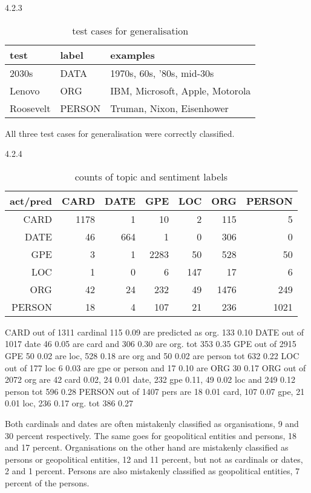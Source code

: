 \documentclass[11pt]{article}
\begin{document}
4.2.3

\begin{table}[ht]\footnotesize
\caption{test cases for generalisation}
\label{tab:generalisation}
\begin{tabular}{ l l l }
test & label & examples \\
\hline
2030s & DATA & 1970s, 60s, '80s, mid-30s \\
Lenovo & ORG & IBM, Microsoft, Apple, Motorola \\
Roosevelt & PERSON & Truman, Nixon, Eisenhower \\
\end{tabular}
\end{table}

All three test cases for generalisation were correctly classified.

4.2.4

\begin{table}[ht]\footnotesize
\caption{counts of topic and sentiment labels}
\label{tab:corpus}
\begin{tabular}{ r r r r r r r }
act/pred & CARD & DATE &  GPE & LOC & ORG  & PERSON \\
\hline
  CARD   & 1178 &    1 &   10 &   2 &  115 &      5 \\
  DATE   &   46 &  664 &    1 &   0 &  306 &      0 \\
   GPE   &    3 &    1 & 2283 &  50 &  528 &     50 \\
   LOC   &    1 &    0 &    6 & 147 &   17 &      6 \\
   ORG   &   42 &   24 &  232 &  49 & 1476 &    249 \\
PERSON   &   18 &    4 &  107 &  21 &  236 &   1021 \\
\end{tabular}
\end{table}

  CARD out of 1311 cardinal 115 0.09 are predicted as org. 133 0.10
  DATE out of 1017 date 46 0.05 are card and 306 0.30 are org. tot 353 0.35
   GPE out of 2915 GPE 50 0.02 are loc, 528 0.18 are org and 50 0.02 are person tot 632 0.22
   LOC out of 177 loc 6 0.03 are gpe or person and 17 0.10 are ORG 30 0.17
   ORG out of 2072 org are 42 card 0.02, 24 0.01 date, 232 gpe 0.11, 49 0.02 loc and 249 0.12 person tot 596 0.28
PERSON out of 1407 pers are 18 0.01 card, 107 0.07 gpe, 21 0.01 loc, 236 0.17 org. tot 386 0.27

Both cardinals and dates are often mistakenly classified as organisations, 9 and 30 percent respectively. The same goes for geopolitical entities and persons, 18 and 17 percent. Organisations on the other hand are mistakenly classified as persons or geopolitical entities, 12 and 11 percent, but not as cardinals or dates, 2 and 1 percent. Persons are also mistakenly classified as geopolitical entities, 7 percent of the persons.
\end{document}
